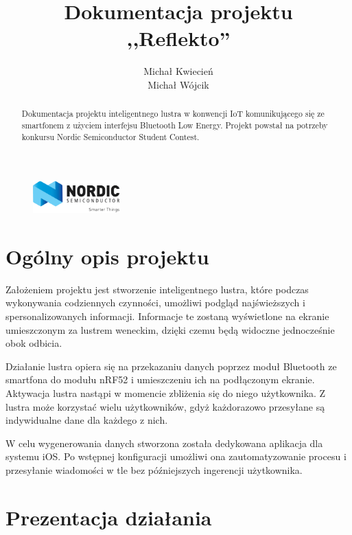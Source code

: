\documentclass[a4paper,11pt]{article}
\begin{document}
\title{Dokumentacja projektu \\ \textbf{,,Reflekto'' } }
\author{Michał Kwiecień \\ Michał Wójcik}
\maketitle

\begin{abstract}
Dokumentacja projektu inteligentnego lustra w konwencji IoT komunikującego się ze smartfonem z użyciem interfejsu Bluetooth Low Energy. Projekt powstał na potrzeby konkursu Nordic Semiconductor Student Contest. 
\end{abstract}

\begin{figure}
	\includegraphics[width=0.3\textwidth,center]{logo_nordic.png}
\end{figure}

\cleardoublepage
\tableofcontents
\clearpage

\section{Ogólny opis projektu}

Założeniem projektu jest stworzenie inteligentnego lustra, które podczas wykonywania codziennych czynności, umożliwi podgląd najświeższych i spersonalizowanych informacji. Informacje te zostaną wyświetlone na ekranie umieszczonym za lustrem weneckim, dzięki czemu będą widoczne jednocześnie obok odbicia. 

Działanie lustra opiera się na przekazaniu danych poprzez moduł Bluetooth ze smartfona do modułu nRF52 i umieszczeniu ich na podłączonym ekranie. Aktywacja lustra nastąpi w momencie zbliżenia się do niego użytkownika. Z lustra może korzystać wielu użytkowników, gdyż każdorazowo przesyłane są indywidualne dane dla każdego z nich. 

W celu wygenerowania danych stworzona została dedykowana aplikacja dla systemu iOS. Po wstępnej konfiguracji umożliwi ona zautomatyzowanie procesu i przesyłanie wiadomości w tle bez późniejszych ingerencji użytkownika.


\section{Prezentacja działania}
\end{document}
